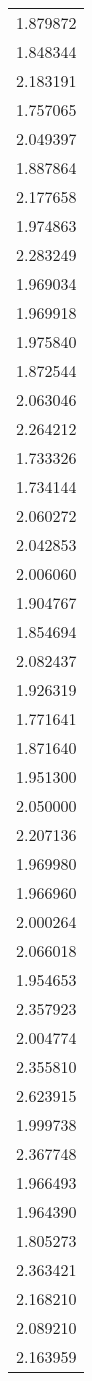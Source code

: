 \begin{longtable}[c]{l}
    1.879872 \\
    1.848344 \\
    2.183191 \\
    1.757065 \\
    2.049397 \\
    1.887864 \\
    2.177658 \\
    1.974863 \\
    2.283249 \\
    1.969034 \\
    1.969918 \\
    1.975840 \\
    1.872544 \\
    2.063046 \\
    2.264212 \\
    1.733326 \\
    1.734144 \\
    2.060272 \\
    2.042853 \\
    2.006060 \\
    1.904767 \\
    1.854694 \\
    2.082437 \\
    1.926319 \\
    1.771641 \\
    1.871640 \\
    1.951300 \\
    2.050000 \\
    2.207136 \\
    1.969980 \\
    1.966960 \\
    2.000264 \\
    2.066018 \\
    1.954653 \\
    2.357923 \\
    2.004774 \\
    2.355810 \\
    2.623915 \\
    1.999738 \\
    2.367748 \\
    1.966493 \\
    1.964390 \\
    1.805273 \\
    2.363421 \\
    2.168210 \\
    2.089210 \\
    2.163959 \\

\end{longtable}
